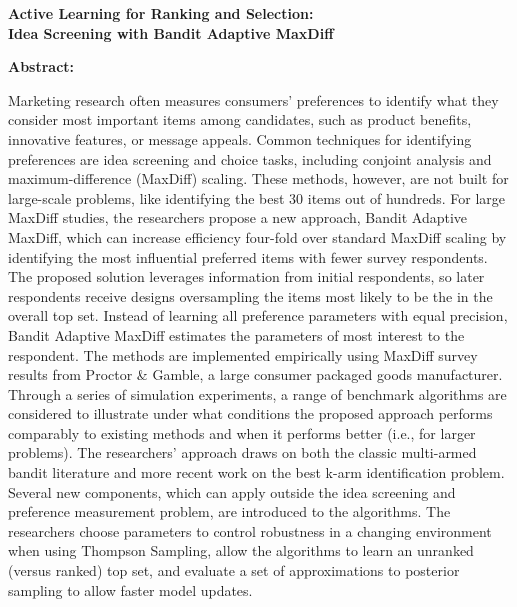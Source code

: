 \documentclass[a4paper,11pt]{article}
\newcommand{\titleofthispaper}{
	\textbf{Active Learning for Ranking and Selection: \\
	Idea Screening with Bandit Adaptive MaxDiff} 
}
\begin{document}




\titleofthispaper \\
\vspace{1mm}




\textbf{Abstract:}
{%
Marketing research often measures consumers' preferences to identify what they consider most important items among candidates, such as product benefits, innovative features, or message appeals. Common techniques for identifying preferences are idea screening and choice tasks, including conjoint analysis and maximum-difference (MaxDiff) scaling. These methods, however, are not built for large-scale problems, like identifying the best 30 items out of hundreds. For large MaxDiff studies, the researchers propose a new approach, Bandit Adaptive MaxDiff, which can increase efficiency four-fold over standard MaxDiff scaling by identifying the most influential preferred items with fewer survey respondents. The proposed solution leverages information from initial respondents, so later respondents receive designs oversampling the items most likely to be the in the overall top set. Instead of learning all preference parameters with equal precision, Bandit Adaptive MaxDiff estimates the parameters of most interest to the respondent. The methods are implemented empirically using MaxDiff survey results from Proctor \& Gamble, a large consumer packaged goods manufacturer.  Through a series of simulation experiments, a range of benchmark algorithms are considered to illustrate under what conditions the proposed approach performs comparably to existing methods and when it performs better (i.e., for larger problems). The researchers' approach draws on both the classic multi-armed bandit literature and more recent work on the best k-arm identification problem. Several new components, which can apply outside the idea screening and preference measurement problem, are introduced to the algorithms. The researchers choose parameters to control robustness in a changing environment when using Thompson Sampling, allow the algorithms to learn an unranked (versus ranked) top set, and evaluate a set of approximations to posterior sampling to allow faster model updates.

}~ \\
\end{document}
